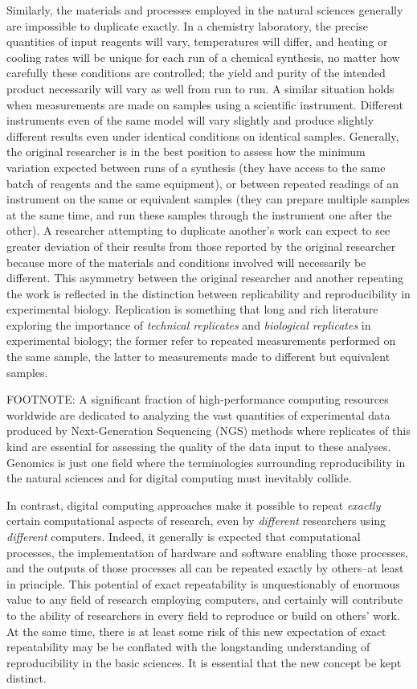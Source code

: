 Similarly, the materials and processes employed in the natural sciences generally are impossible
	to duplicate exactly.
In a chemistry laboratory, the precise quantities of input reagents will vary, temperatures will differ, and heating
	or cooling rates will be unique for each run of a chemical synthesis, no matter how carefully these conditions
	are controlled; the yield and purity of the intended product necessarily will vary as well from run to run.
A similar situation holds when measurements are made on samples using a scientific instrument. 
Different instruments even of the same model will vary slightly and produce slightly different results even
	under identical conditions on identical samples.
Generally, the original researcher is in the best position to assess how the minimum variation expected
	between runs of a synthesis (they have access to the same batch of reagents and the same equipment), 
	or between repeated readings of an instrument on the same or equivalent samples (they can prepare
	multiple samples at the same time, and run these samples through the instrument one after the other).
A researcher attempting to duplicate another's work can expect to see greater deviation of their results from those reported
	by the original researcher because more of the materials and conditions involved will necessarily be different.
This asymmetry between the original researcher and another repeating the work is reflected in the distinction
	between replicability and reproducibility in experimental biology.
Replication is something that long and rich literature
	exploring the importance of \emph{technical replicates} and \emph{biological replicates} in experimental biology;
	the former refer to repeated measurements performed on the same sample, the latter to measurements made
	to different but equivalent samples.

FOOTNOTE: A significant fraction of high-performance computing resources worldwide are dedicated to analyzing the vast quantities of
	experimental data produced by Next-Generation Sequencing (NGS) methods where replicates of this kind are essential for
	assessing the quality of the data input to these analyses. Genomics is just one field where the terminologies surrounding
	reproducibility in the natural sciences and for digital computing must inevitably collide.

In contrast, digital computing approaches make it possible to repeat \emph{exactly} certain computational aspects of research,
	 even by \emph{different} researchers using \emph{different} computers.  
Indeed, it generally is expected that computational processes, the implementation of hardware and software 
	enabling those processes, and the outputs of those processes all can be repeated exactly by others--at least in principle.
This potential of exact repeatability is unquestionably of enormous value to any field of research employing computers,
	and certainly will contribute to the ability of researchers in every field to reproduce or build on others' work.
At the same time, there is at least some risk of this new expectation of exact repeatability may be be conflated 
	with the longstanding understanding of reproducibility in the basic sciences. 
It is essential that the new concept be kept distinct.

